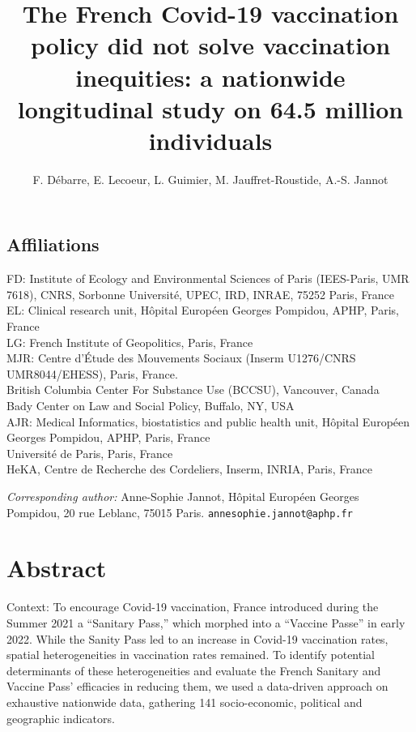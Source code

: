 \documentclass[
]{article}
\title{The French Covid-19 vaccination policy did not solve vaccination inequities: a nationwide longitudinal study on 64.5 million individuals}
\author{F. Débarre, E. Lecoeur, L. Guimier, M. Jauffret-Roustide, A.-S. Jannot}
\date{}
\begin{document}
\maketitle

\hypertarget{affiliations}{%
\subsection{Affiliations}\label{affiliations}}

FD: Institute of Ecology and Environmental Sciences of Paris (IEES-Paris, UMR 7618), CNRS, Sorbonne Université, UPEC, IRD, INRAE, 75252 Paris, France\\
EL: Clinical research unit, Hôpital Européen Georges Pompidou, APHP, Paris, France\\
LG: French Institute of Geopolitics, Paris, France\\
MJR: Centre d'Étude des Mouvements Sociaux (Inserm U1276/CNRS UMR8044/EHESS), Paris, France.\\
British Columbia Center For Substance Use (BCCSU), Vancouver, Canada\\
Bady Center on Law and Social Policy, Buffalo, NY, USA\\
AJR: Medical Informatics, biostatistics and public health unit, Hôpital Européen Georges Pompidou, APHP, Paris, France\\
Université de Paris, Paris, France\\
HeKA, Centre de Recherche des Cordeliers, Inserm, INRIA, Paris, France

\emph{Corresponding author:} Anne-Sophie Jannot, Hôpital Européen Georges Pompidou, 20 rue Leblanc, 75015 Paris. \texttt{annesophie.jannot@aphp.fr}

\hypertarget{abstract}{%
\section{Abstract}\label{abstract}}

Context: To encourage Covid-19 vaccination, France introduced during the Summer 2021 a ``Sanitary Pass,'' which morphed into a ``Vaccine Passe'' in early 2022. While the Sanity Pass led to an increase in Covid-19 vaccination rates, spatial heterogeneities in vaccination rates remained. To identify potential determinants of these heterogeneities and evaluate the French Sanitary and Vaccine Pass' efficacies in reducing them, we used a data-driven approach on exhaustive nationwide data, gathering 141 socio-economic, political and geographic indicators.
\end{document}
